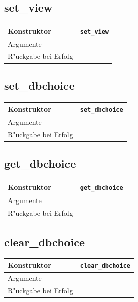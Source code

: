\documentclass[11pt, twoside, a4paper, BCOR8mm, DIV12, bibtotoc,idxtotoc]{scrbook}
\begin{document}
\subsection{set\_view}
\begin{shadowenv}
\begin{tabular}{lp{10cm}}
  Konstruktor & \texttt{set\_view}\\
  \hline
  Argumente     & \\
  R"uckgabe bei Erfolg & \\
\end{tabular}
\end{shadowenv}

\subsection{set\_dbchoice}
\begin{shadowenv}
\begin{tabular}{lp{10cm}}
  Konstruktor & \texttt{set\_dbchoice}\\
  \hline
  Argumente     & \\
  R"uckgabe bei Erfolg & \\
\end{tabular}
\end{shadowenv}

\subsection{get\_dbchoice}
\begin{shadowenv}
\begin{tabular}{lp{10cm}}
  Konstruktor & \texttt{get\_dbchoice}\\
  \hline
  Argumente     & \\
  R"uckgabe bei Erfolg & \\
\end{tabular}
\end{shadowenv}

\subsection{clear\_dbchoice}
\begin{shadowenv}
\begin{tabular}{lp{10cm}}
  Konstruktor & \texttt{clear\_dbchoice}\\
  \hline
  Argumente     & \\
  R"uckgabe bei Erfolg & \\
\end{tabular}
\end{shadowenv}
\end{document}
